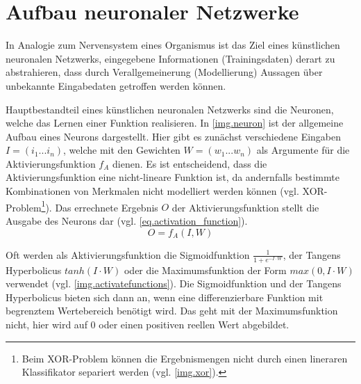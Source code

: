 \section{Aufbau neuronaler Netzwerke}\label{s.architektur}
In Analogie zum Nervensystem eines Organismus ist das Ziel eines künstlichen neuronalen Netzwerks, eingegebene Informationen (Trainingsdaten) derart zu abstrahieren, dass durch Verallgemeinerung (Modellierung) Aussagen über unbekannte Eingabedaten getroffen werden können.


Hauptbestandteil eines künstlichen neuronalen Netzwerks sind die Neuronen, welche das Lernen einer Funktion realisieren. In \autoref{img.neuron} ist der allgemeine Aufbau eines Neurons dargestellt. Hier gibt es zunächst verschiedene Eingaben $I = (i_1 ... i_n)$, welche mit den Gewichten $W = (w_1 ... w_n)$ als Argumente für die Aktivierungsfunktion $f_A$ dienen. Es ist entscheidend, dass die Aktivierungsfunktion eine nicht-lineare Funktion ist, da andernfalls bestimmte Kombinationen von Merkmalen nicht modelliert werden können (vgl. XOR-Problem\footnote{Beim XOR-Problem können die Ergebnismengen nicht durch einen lineraren Klassifikator separiert werden (vgl. \autoref{img.xor}).}). Das errechnete Ergebnis $O$ der Aktivierungsfunktion stellt die Ausgabe des Neurons dar (vgl. \autoref{eq.activation_function}).
\begin{equation}
    O = f_A(I, W)  \label{eq.activation_function}
\end{equation}

Oft werden als Aktivierungsfunktion die Sigmoidfunktion $\frac{1}{1+e^{-I \cdot W}}$, der Tangens Hyperbolicus $tanh(I \cdot W)$ oder die Maximumsfunktion der Form $max(0, I \cdot W)$ verwendet (vgl. \autoref{img.activatefunctions}). Die Sigmoidfunktion und der Tangens Hyperbolicus bieten sich dann an, wenn eine differenzierbare Funktion mit begrenztem Wertebereich benötigt wird. Das geht mit der Maximumsfunktion nicht, hier wird auf 0 oder einen positiven reellen Wert abgebildet.

